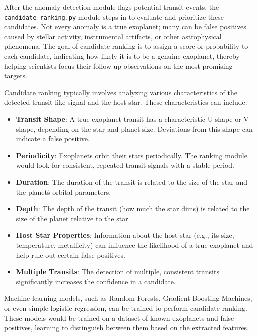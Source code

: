\documentclass{article}
\begin{document}
After the anomaly detection module flags potential transit events, the \texttt{candidate\_ranking.py} module steps in to evaluate and prioritize these candidates. Not every anomaly is a true exoplanet; many can be false positives caused by stellar activity, instrumental artifacts, or other astrophysical phenomena. The goal of candidate ranking is to assign a score or probability to each candidate, indicating how likely it is to be a genuine exoplanet, thereby helping scientists focus their follow-up observations on the most promising targets.

Candidate ranking typically involves analyzing various characteristics of the detected transit-like signal and the host star. These characteristics can include:

\begin{itemize}
    \item \textbf{Transit Shape}: A true exoplanet transit has a characteristic U-shape or V-shape, depending on the star and planet size. Deviations from this shape can indicate a false positive.
    \item \textbf{Periodicity}: Exoplanets orbit their stars periodically. The ranking module would look for consistent, repeated transit signals with a stable period.
    \item \textbf{Duration}: The duration of the transit is related to the size of the star and the planet\'s orbital parameters.
    \item \textbf{Depth}: The depth of the transit (how much the star dims) is related to the size of the planet relative to the star.
    \item \textbf{Host Star Properties}: Information about the host star (e.g., its size, temperature, metallicity) can influence the likelihood of a true exoplanet and help rule out certain false positives.
    \item \textbf{Multiple Transits}: The detection of multiple, consistent transits significantly increases the confidence in a candidate.
\end{itemize}

Machine learning models, such as Random Forests, Gradient Boosting Machines, or even simple logistic regression, can be trained to perform candidate ranking. These models would be trained on a dataset of known exoplanets and false positives, learning to distinguish between them based on the extracted features.
\end{document}
